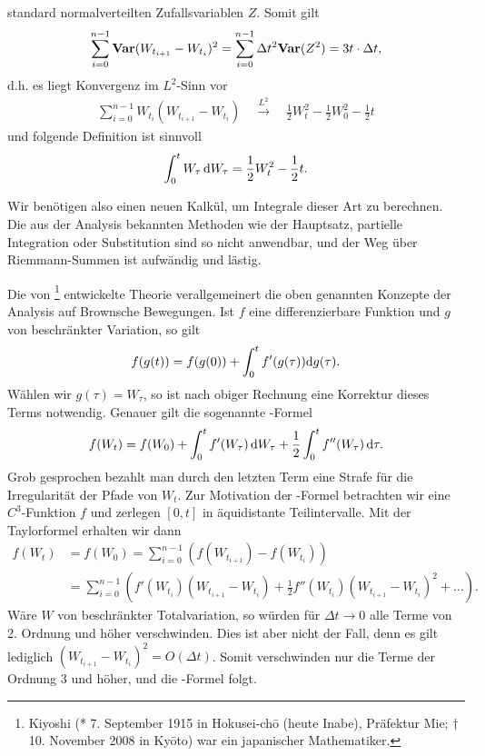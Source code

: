 standard normalverteilten Zufallsvariablen $Z$. Somit gilt
\begin{align*}
\sum_{i=0}^{n-1}
\mathbf{Var} (W_{t_{i+1}}-W_{t_i})^2 = 
 \sum_{i=0}^{n-1} \Delta t^2\mathbf{Var}(Z^2) = 3 t\cdot \Delta t,
\end{align*}
d.h. es liegt Konvergenz im $L^2$-Sinn vor
\begin{align*}
\sum_{i=0}^{n-1} W_{t_i}(W_{t_{i+1}}-W_{t_i})
\quad\overset{L^2}{\longrightarrow}\quad
\frac{1}{2}W_t^2 - \frac{1}{2}W_0^2 - \frac{1}{2}t
\end{align*}
und folgende Definition ist sinnvoll
\begin{align*}
\int_0^t W_\tau\,\mathrm{d} W_\tau = \frac{1}{2}W_t^2 - \frac{1}{2}t.
\end{align*}

Wir benötigen also einen neuen Kalkül, um Integrale dieser Art zu berechnen.
Die aus der Analysis bekannten Methoden wie der Hauptsatz, partielle Integration
oder Substitution sind so nicht anwendbar, und der Weg über Riemmann-Summen ist
aufwändig und lästig.

Die von \Ito\footnote{\Ito Kiyoshi (* 7. September 1915 in Hokusei-chō
(heute Inabe), Präfektur Mie; † 10. November 2008 in Kyōto) war ein japanischer
Mathematiker.} entwickelte Theorie verallgemeinert die oben genannten Konzepte
der Analysis auf Brownsche Bewegungen. Ist $f$ eine differenzierbare
Funktion und $g$ von beschränkter Variation, so gilt
\begin{align*}
f(g(t)) = f(g(0)) + \int_0^t f'(g(\tau))\mathrm{d} g(\tau).
\end{align*}
Wählen wir $g(\tau) = W_\tau$, so ist nach obiger Rechnung eine Korrektur dieses
Terms notwendig. Genauer gilt die sogenannte \Ito-Formel
\begin{align*}
f(W_t) = f(W_0) + \int_0^t f'(W_\tau)\,\mathrm{d} W_\tau + \frac{1}{2}\int_0^t
f''(W_\tau)\,\mathrm{d} \tau.
\end{align*}
Grob gesprochen bezahlt man durch den letzten Term eine Strafe für die
Irregularität der Pfade von $W_t$. Zur Motivation der \Ito-Formel betrachten wir
eine $C^3$-Funktion $f$ und zerlegen $[0,t]$ in äquidistante Teilintervalle. Mit der
Taylorformel erhalten wir dann
\begin{align*}
f(W_t) &= f(W_0) = \sum_{i=0}^{n-1} (f(W_{t_{i+1}}) - f(W_{t_i}))\\
 &= \sum_{i=0}^{n-1} \left(f'(W_{t_i})(W_{t_{i+1}}-W_{t_i}) + 
 \frac{1}{2}f''(W_{t_i})(W_{t_{i+1}}-W_{t_i})^2 + \ldots\right).
\end{align*}
Wäre $W$ von beschränkter Totalvariation, so würden für $\Delta t \to 0$ alle
Terme von 2. Ordnung und höher verschwinden. Dies ist aber nicht der Fall, denn
es gilt lediglich $(W_{t_{i+1}}-W_{t_i})^2 = O(\Delta t)$. Somit verschwinden
nur die Terme der Ordnung 3 und höher, und die \Ito-Formel folgt.

